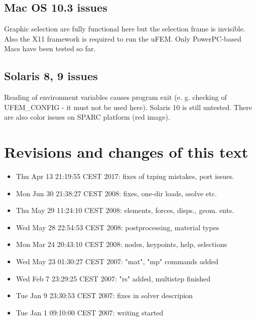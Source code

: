 \documentclass{article}
\begin{document}
\subsection{Mac OS 10.3 issues}

 Graphic selection are fully functional here but
 the selection frame is invisible. Also the X11 framework is
 required to run the uFEM. Only PowerPC-based Macs have been
 tested so far.



\subsection{Solaris 8, 9 issues}

 Reading of environment variables causes program exit
 (e. g. checking of UFEM\_CONFIG - it must not be used here).
 Solaris 10 is still untested. There are also color issues
 on SPARC platform (red image).



\section{Revisions and changes of this text}
\begin{itemize}
\item  Thu Apr 13 21:19:55 CEST 2017: fixes of tzping mistakes, port issues.
\item  Mon Jun 30 21:38:27 CEST 2008: fixes, one-dir loads, ssolve etc.
\item  Thu May 29 11:24:10 CEST 2008: elements, forces, disps., geom. ents.
\item  Wed May 28 22:54:53 CEST 2008: postprocessing, material types
\item  Mon Mar 24 20:43:10 CEST 2008: nodes, keypoints, help, selections
\item  Wed May 23 01:30:27 CEST 2007: "mat", "mp" commands added
\item  Wed Feb  7 23:29:25 CEST 2007: "rs" added, multistep finished
\item  Tue Jan  9 23:30:53 CEST 2007: fixes in solver descripion
\item  Tue Jan  1 09:10:00 CEST 2007: writing started
\end{itemize}
\end{document}
